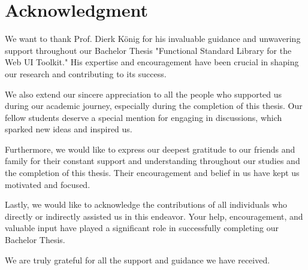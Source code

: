 \chapter{Acknowledgment}
We want to thank Prof. Dierk König for his invaluable guidance and unwavering
support throughout our Bachelor Thesis "Functional Standard Library for
the Web UI Toolkit." His expertise and encouragement have been crucial in
shaping our research and contributing to its success.

We also extend our sincere appreciation to all the people who supported us
during our academic journey, especially during the completion of this thesis.
Our fellow students deserve a special mention for engaging in discussions,
which sparked new ideas and inspired us.

Furthermore, we would like to express our deepest gratitude to our friends and
family for their constant support and understanding throughout our studies and
the completion of this thesis. Their encouragement and belief in us have kept
us motivated and focused.

Lastly, we would like to acknowledge the contributions of all individuals who
directly or indirectly assisted us in this endeavor. Your help, encouragement,
and valuable input have played a significant role in successfully completing
our Bachelor Thesis.

We are truly grateful for all the support and guidance we have received.
